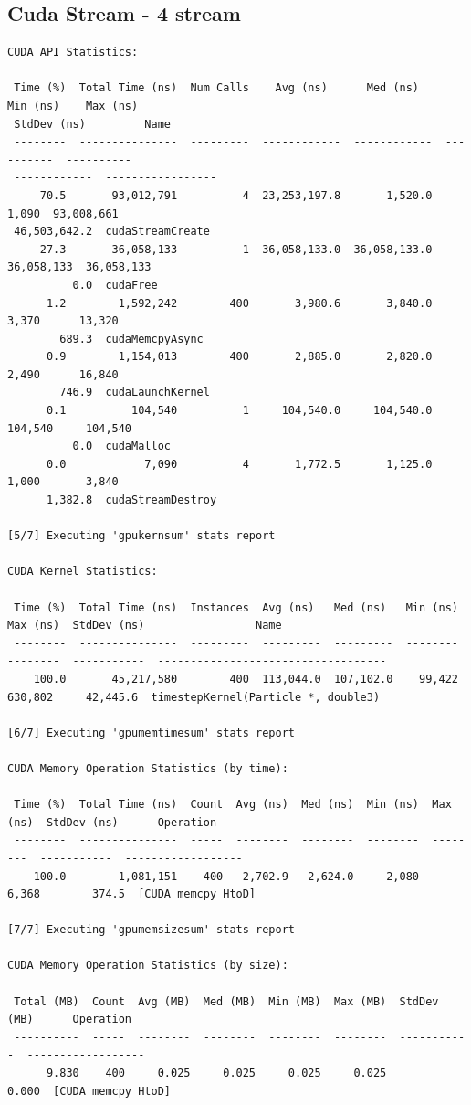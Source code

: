 \documentclass[english]{exam}
\begin{document}
\subsection*{Cuda Stream - 4 stream}

\begin{lstlisting}
CUDA API Statistics:

 Time (%)  Total Time (ns)  Num Calls    Avg (ns)      Med (ns)     Min (ns)    Max (ns)  
 StdDev (ns)         Name       
 --------  ---------------  ---------  ------------  ------------  ----------  ---------- 
 ------------  -----------------
     70.5       93,012,791          4  23,253,197.8       1,520.0       1,090  93,008,661 
 46,503,642.2  cudaStreamCreate 
     27.3       36,058,133          1  36,058,133.0  36,058,133.0  36,058,133  36,058,133 
          0.0  cudaFree         
      1.2        1,592,242        400       3,980.6       3,840.0       3,370      13,320 
        689.3  cudaMemcpyAsync  
      0.9        1,154,013        400       2,885.0       2,820.0       2,490      16,840 
        746.9  cudaLaunchKernel 
      0.1          104,540          1     104,540.0     104,540.0     104,540     104,540 
          0.0  cudaMalloc       
      0.0            7,090          4       1,772.5       1,125.0       1,000       3,840 
      1,382.8  cudaStreamDestroy

[5/7] Executing 'gpukernsum' stats report

CUDA Kernel Statistics:

 Time (%)  Total Time (ns)  Instances  Avg (ns)   Med (ns)   Min (ns)  Max (ns)  StdDev (ns)                 Name                
 --------  ---------------  ---------  ---------  ---------  --------  --------  -----------  -----------------------------------
    100.0       45,217,580        400  113,044.0  107,102.0    99,422   630,802     42,445.6  timestepKernel(Particle *, double3)

[6/7] Executing 'gpumemtimesum' stats report

CUDA Memory Operation Statistics (by time):

 Time (%)  Total Time (ns)  Count  Avg (ns)  Med (ns)  Min (ns)  Max (ns)  StdDev (ns)      Operation     
 --------  ---------------  -----  --------  --------  --------  --------  -----------  ------------------
    100.0        1,081,151    400   2,702.9   2,624.0     2,080     6,368        374.5  [CUDA memcpy HtoD]

[7/7] Executing 'gpumemsizesum' stats report

CUDA Memory Operation Statistics (by size):

 Total (MB)  Count  Avg (MB)  Med (MB)  Min (MB)  Max (MB)  StdDev (MB)      Operation     
 ----------  -----  --------  --------  --------  --------  -----------  ------------------
      9.830    400     0.025     0.025     0.025     0.025        0.000  [CUDA memcpy HtoD]
  
\end{lstlisting}


\renewcommand{\bibname}{References}

\end{document}
